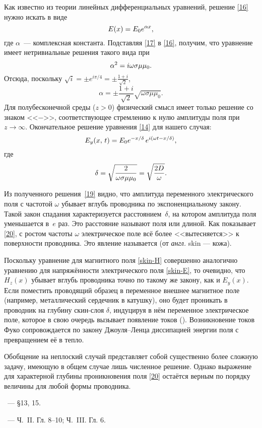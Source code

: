 Как известно из теории линейных дифференциальных уравнений, решение
\eqref{16} нужно искать в виде 
\begin{equation} \eqmark{17}
E(x)=E_0 e^{\alpha x},
\end{equation}
где $\alpha$~--- комплексная константа. 
Подставляя \eqref{17} в \eqref{16}, получим, что уравнение имеет
нетривиальные решения такого вида при
\begin{equation} \eqmark{18}
\alpha^2=i\omega\sigma\mu\mu_0.
\end{equation}
Отсюда, поскольку $\sqrt{i} = \pm e^{i\pi/4}  = \pm \frac{1+i}{\sqrt{2}}$,
\begin{equation*}
\alpha=\pm\frac{1+i}{\sqrt{2}}\sqrt{\omega\sigma\mu\mu_0}.
\end{equation*}
Для полубесконечной среды ($z>0$) физический смысл имеет только решение
со знаком <<$-$>>, соответствующее стремлению к нулю амплитуды поля 
при $z\to \infty$. 
Окончательное решение уравнения \eqref{14} для нашего случая:
\begin{equation} \eqmark{19}
E_y(x,\,t)=E_0e^{-x/\delta}\,e^{i(\omega t- x/\delta)},
\end{equation}
где
\begin{equation} \eqmark{20}
\delta = \sqrt{\frac{2}{\omega\sigma\mu\mu_0}} = \sqrt{\frac{2D}{\omega}}.
\end{equation}

Из полученного решения~\eqref{19} видно, что амплитуда переменного
электрического поля с частотой $\omega$ убывает вглубь
проводника по экспоненциальному закону. 
Такой закон спадания характеризуется расстоянием~$\delta$, 
на котором амплитуда поля уменьшается в~$e$ раз. 
Это расстояние называют  поля
или  длиной.
Как показывает \eqref{20}, 
с ростом частоты $\omega$ электрическое поле всё более <<вытесняется>> 
к поверхности проводника. Это явление называется 
(от \emph{англ.} skin --- кожа). 

Поскольку уравнение для магнитного поля \eqref{skin-H} совершенно аналогично
уравнению для напряжённости электрического поля \eqref{skin-E}, то очевидно, 
что $H_z(x)$ убывает вглубь проводника точно по такому же закону, 
как и $E_y(x)$. Если поместить проводящий образец в переменное внешнее магнитное поле
(например, металлический сердечник в катушку),
оно будет проникать в проводник на глубину скин-слоя $\delta$, индуцируя в нём
переменное электрическое поле, которое в свою очередь 
вызывает появление токов (). Возникновение токов Фуко
сопровождается по закону Джоуля--Ленца диссипацией энергии поля с превращением
её в тепло.

Обобщение на неплоский случай представляет собой
существенно более сложную задачу, имеющую в общем случае лишь численное решение.
Однако выражение для характерной глубины проникновения поля \eqref{20} 
остаётся верным по порядку величины для любой формы проводника.


\begin{lab:literature}
    \item \Kirichenko~--- \S 13, 15.
    \item \KingLokOlh~--- Ч.~II. Гл. 8--10; Ч.~III. Гл. 6.
\end{lab:literature}
    
